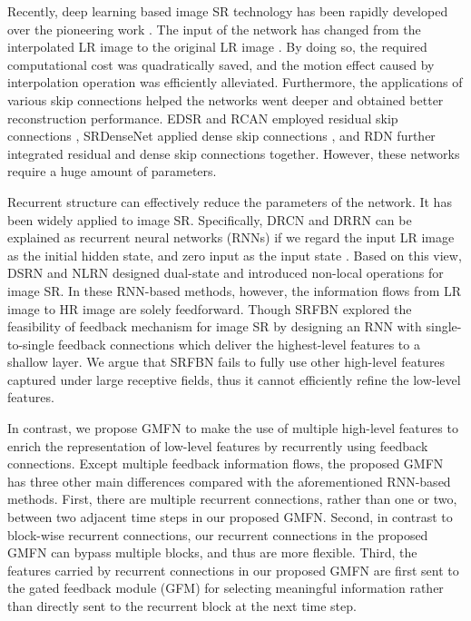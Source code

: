 \documentclass{bmvc2k}
\begin{document}
	Recently, deep learning based image SR technology has been rapidly developed over the pioneering work \cite{dong2014learning}. The input of the network has changed from the interpolated LR image \cite{dong2014learning,kim2016accurate,kim2016deeply} to the original LR image \cite{ledig2017photo,lim2017enhanced,zhang2018residual}. By doing so, the required computational cost was quadratically saved, and the motion effect caused by interpolation operation was efficiently alleviated. Furthermore, the applications of various skip connections helped the networks went deeper and obtained better reconstruction performance. EDSR \cite{lim2017enhanced} and RCAN \cite{zhang2018image} employed residual skip connections \cite{he2016deep}, SRDenseNet \cite{tong2017image} applied dense skip connections \cite{huang2017densely}, and RDN \cite{zhang2018residual} further integrated residual and dense skip connections together. However, these networks require a huge amount of parameters. 
	
	Recurrent structure can effectively reduce the parameters of the network. It has been widely applied to image SR. Specifically, DRCN \cite{kim2016deeply} and DRRN \cite{tai2017image} can be explained as recurrent neural networks (RNNs) if we regard the input LR image as the initial hidden state, and zero input as the input state \cite{han2018image}. Based on this view, DSRN \cite{han2018image} and NLRN \cite{nlrn2018} designed dual-state and introduced non-local operations for image SR. In these RNN-based methods, however, the information flows from LR image to HR image are solely feedforward. Though SRFBN \cite{li2019srfbn} explored the feasibility of feedback mechanism for image SR by designing an RNN with single-to-single feedback connections which deliver the highest-level features to a shallow layer. We argue that SRFBN fails to fully use other high-level features captured under large receptive fields, thus it cannot efficiently refine the low-level features. 
	
	In contrast, we propose GMFN to make the use of multiple high-level features to enrich the representation of low-level features by recurrently using feedback connections. Except multiple feedback information flows, the proposed GMFN has three other main differences compared with the aforementioned RNN-based methods. First, there are multiple recurrent connections, rather than one or two, between two adjacent time steps in our proposed GMFN. Second, in contrast to block-wise recurrent connections, our recurrent connections in the proposed GMFN can bypass multiple blocks, and thus are more flexible. Third, the features carried by recurrent connections in our proposed GMFN are first sent to the gated feedback module (GFM) for selecting meaningful information rather than directly sent to the recurrent block at the next time step.
	
\end{document}

